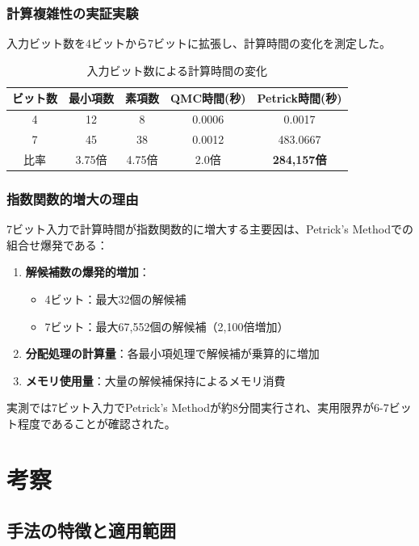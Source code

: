 \documentclass[a4j,dvipdfmx]{jsarticle}
\begin{document}
\subsubsection{計算複雑性の実証実験}

入力ビット数を4ビットから7ビットに拡張し、計算時間の変化を測定した。

\begin{table}[H]
\centering
\caption{入力ビット数による計算時間の変化}
\label{tab:complexity}
\begin{tabular}{|c|c|c|c|c|}
\hline
ビット数 & 最小項数 & 素項数 & QMC時間(秒) & Petrick時間(秒) \\
\hline
4 & 12 & 8 & 0.0006 & 0.0017 \\
7 & 45 & 38 & 0.0012 & 483.0667 \\
\hline
比率 & 3.75倍 & 4.75倍 & 2.0倍 & \textbf{284,157倍} \\
\hline
\end{tabular}
\end{table}

\subsubsection{指数関数的増大の理由}

7ビット入力で計算時間が指数関数的に増大する主要因は、Petrick's Methodでの組合せ爆発である：

\begin{enumerate}
\item \textbf{解候補数の爆発的増加}：
\begin{itemize}
\item 4ビット：最大32個の解候補
\item 7ビット：最大67,552個の解候補（2,100倍増加）
\end{itemize}
\item \textbf{分配処理の計算量}：各最小項処理で解候補が乗算的に増加
\item \textbf{メモリ使用量}：大量の解候補保持によるメモリ消費
\end{enumerate}

実測では7ビット入力でPetrick's Methodが約8分間実行され、実用限界が6-7ビット程度であることが確認された。

\section{考察}

\subsection{手法の特徴と適用範囲}
\end{document}
